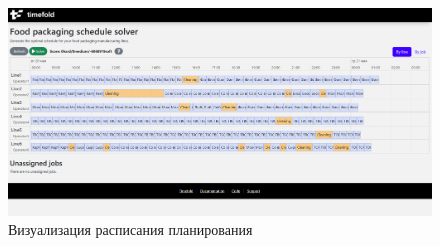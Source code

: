  \begin{figure}[ht]
 \centering
		\includegraphics[height = 8 cm, keepaspectratio]{../assets/images/3_1_1Quarkus.png}
		\caption{Визуализация расписания планирования}
		\label{fig:diagram_1}
\end{figure}

